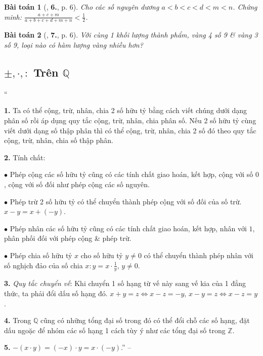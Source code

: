 \documentclass{article}
\numberwithin{equation}{section}
\newtheorem{baitoan}{Bài toán}[section]
\begin{document}
\begin{baitoan}[\cite{Tuyen_Toan_7}, \textbf{6.}, p. 6]
	Cho các số nguyên dương $a < b < c < d < m < n$. Chứng minh: $\frac{a + c + m}{ a + b + c + d + m + n} < \frac{1}{2}$.
\end{baitoan}

\begin{baitoan}[\cite{Tuyen_Toan_7}, \textbf{7.}, p. 6]
	Với cùng 1 khối lượng thành phẩm, vàng 4 số 9 \& vàng 3 số 9, loại nào có hàm lượng vàng nhiều hơn?
\end{baitoan}


\subsection{$\pm,\cdot,:$ Trên $\mathbb{Q}$}
``\begin{enumerate*}
	\item[\textbf{1.}] Ta có thể cộng, trừ, nhân, chia 2 số hữu tỷ bằng cách viết chúng dưới dạng phân số rồi áp dụng quy tắc cộng, trừ, nhân, chia phân số. Nếu 2 số hữu tỷ cùng viết dưới dạng số thập phân thì có thể cộng, trừ, nhân, chia 2 số đó theo quy tắc cộng, trừ, nhân, chia số thập phân.
	\item[\textbf{2.}] Tính chất:
	\begin{enumerate*}
		\item[$\bullet$] Phép cộng các số hữu tỷ cũng có các tính chất giao hoán, kết hợp, cộng với số $0$, cộng với số đối như phép cộng các số nguyên.
		\item[$\bullet$] Phép trừ 2 số hữu tỷ có thể chuyển thành phép cộng với số đối của số trừ. $x - y = x + (-y)$.
		\item[$\bullet$] Phép nhân các số hữu tỷ cũng có các tính chất giao hoán, kết hợp, nhân với $1$, phân phối đối với phép cộng \& phép trừ.
		\item[$\bullet$] Phép chia số hữu tỷ $x$ cho số hữu tỷ $y\ne 0$ có thể chuyển thành phép nhân với số nghịch đảo của số chia $x:y = x\cdot\frac{1}{y}$, $y\ne 0$.
	\end{enumerate*}
	\item[\textbf{3.}] \textit{Quy tắc chuyển vế}: Khi chuyển 1 số hạng từ vế này sang vế kia của 1 đẳng thức, ta phải đổi dấu số hạng đó. $x + y = z\Leftrightarrow x - z = -y$, $x - y = z\Leftrightarrow x - z = y$.
	\item[\textbf{4.}] Trong $\mathbb{Q}$ cũng có những tổng đại số trong đó có thể đổi chỗ các số hạng, đặt dấu ngoặc để nhóm các số hạng 1 cách tùy ý như các tổng đại số trong $\mathbb{Z}$.
	\item[\textbf{5.}] $-(x\cdot y) = (-x)\cdot y = x\cdot(-y)$.'' -- \cite[\S2, pp. 6--7]{Tuyen_Toan_7}
\end{enumerate*}
\end{document}
